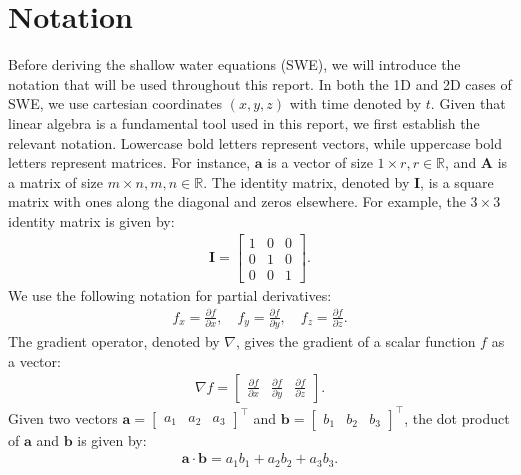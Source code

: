 \section{Notation}
Before deriving the shallow water equations (SWE), we will introduce the notation that will be used throughout this report.
In both the 1D and 2D cases of SWE, we use cartesian coordinates $(x, y, z)$ with time denoted by $t$.
Given that linear algebra is a fundamental tool used in this report, we first establish the relevant notation.
Lowercase bold letters represent vectors, while uppercase bold letters represent matrices.
For instance, $\mathbf{a}$ is a vector of size $1 \times r, r \in \mathbb{R}$, and $\mathbf{A}$ is a matrix of size $m \times n, m,n \in \mathbb{R}$.
The identity matrix, denoted by $\mathbf{I}$, is a square matrix with ones along the diagonal and zeros elsewhere.
For example, the $3 \times 3$ identity matrix is given by:
\begin{align*}
    \mathbf{I} = \begin{bmatrix}
        1 & 0 & 0 \\
        0 & 1 & 0 \\
        0 & 0 & 1
    \end{bmatrix}.
\end{align*}
We use the following notation for partial derivatives:
\begin{align*}
   f_x =  \frac{\partial f}{\partial x}, \quad f_y = \frac{\partial f}{\partial y}, \quad f_z = \frac{\partial f}{\partial z}.
\end{align*}
The gradient operator, denoted by $\nabla$, gives the gradient of a scalar function $f$ as a vector:
\begin{align*}
    \nabla f = \begin{bmatrix}
        \frac{\partial f}{\partial x} &
        \frac{\partial f}{\partial y} &
        \frac{\partial f}{\partial z}
    \end{bmatrix}.
\end{align*}
Given two vectors $\mathbf{a} = \begin{bmatrix}
    a_1 & a_2 & a_3
\end{bmatrix}^\top $ and $\mathbf{b} = \begin{bmatrix}
    b_1 & b_2 & b_3
\end{bmatrix}^\top$, the dot product of $\mathbf{a}$ and $\mathbf{b}$ is given by:
\begin{align*}
    \mathbf{a} \cdot \mathbf{b} = a_1 b_1 + a_2 b_2 + a_3 b_3.
\end{align*}
